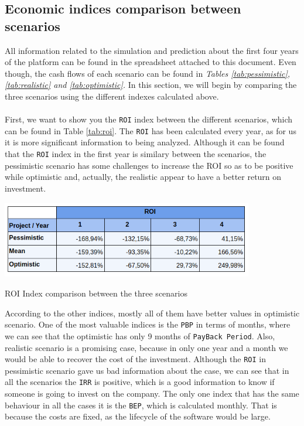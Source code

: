 \subsection{Economic indices comparison between scenarios}
All information related to the simulation and prediction about the first four years of the platform can be found in the spreadsheet attached to this document. Even though, the cash flows of each scenario can be found in \textit{Tables \ref{tab:pessimistic}, \ref{tab:realistic} and \ref{tab:optimistic}.}
In this section, we will begin by comparing the three scenarios using the different indexes calculated above. \\
\\
First, we want to show you the \texttt{ROI} index between the different scenarios, which can be found in Table \ref{tab:roi}. The \texttt{ROI} has been calculated every year, as for us it is more significant information to being analyzed. Although it can be found that the \texttt{ROI} index in the first year is similary between the scenarios, the pessimistic scenario has some challenges to increase the ROI so as to be positive while optimistic and, actually, the realistic appear to have a better return on investment.
\begin{table}[H]
	\centering
	\includegraphics[width=11cm]{roi.png}
	\caption{ROI Index comparison between the three scenarios}
	\label{tab:roi}
\end{table}
According to the other indices, mostly all of them have better values in optimistic scenario. One of the most valuable indices is the \texttt{PBP} in terms of months, where we can see that the optimistic has only 9 months of \texttt{PayBack Period}. Also, realistic scenario is a promising case, because in only one year and a month we would be able to recover the cost of the investment. Although the \texttt{ROI} in pessimistic scenario gave us bad information about the case, we can see that in all the scenarios the \texttt{IRR} is positive, which is a good information to know if someone is going to invest on the company. The only one index that has the same behaviour in all the cases it is the \texttt{BEP}, which is calculated monthly. That is because the costs are fixed, as the lifecycle of the software would be large.
